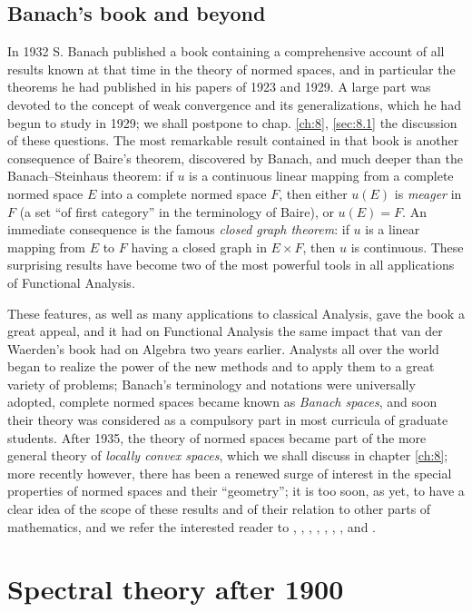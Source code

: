 \documentclass[12pt,a4paper,leqno,twoside]{extbook}
\begin{document}
\section{Banach's book and beyond}
\label{sec:6.5}

In 1932 S. Banach published a book \cite{015} containing a comprehensive account of all results known at that time in the theory of normed spaces, and in particular the theorems he had published in his papers of 1923 and 1929. A large part was devoted to the concept of weak convergence and its generalizations, which he had begun to study in 1929; we shall postpone to chap. \ref{ch:8}, \ref{sec:8.1} the discussion of these questions. The most remarkable result contained in that book is another consequence of Baire's theorem, discovered by Banach, and much deeper than the Banach--Steinhaus theorem: if \(u\) is a continuous linear mapping from a complete normed space \(E\) into a complete normed space \(F\), then either \(u(E)\) is \emph{meager} in \(F\) (a set ``of first category'' in the terminology of Baire), or \(u(E) = F\). An immediate consequence is the famous \emph{closed graph theorem}: if \(u\) is a linear mapping from \(E\) to \(F\) having a closed graph in \(E \times F\), then \(u\) is continuous. These surprising results have become two of the most powerful tools in all applications of Functional Analysis.

These features, as well as many applications to classical Analysis, gave the book a great appeal, and it had on Functional Analysis the same impact that van der Waerden's book had on Algebra two years earlier. Analysts all over the world began to realize the power of the new methods and to apply them to a great variety of problems; Banach's terminology and notations were universally adopted, complete normed spaces became known as \emph{Banach spaces}, and soon their theory was considered as a compulsory part in most curricula of graduate students. After 1935, the theory of normed spaces became part of the more general theory of \emph{locally convex spaces}, which we shall discuss in chapter \ref{ch:8}; more recently however, there has been a renewed surge of interest in the special properties of normed spaces and their ``geometry''; it is too soon, as yet, to have a clear idea of the scope of these results and of their relation to other parts of mathematics, and we refer the interested reader to \cite{004}, \cite{017}, \cite{047}, \cite{050}, \cite{116}, \cite{134}, \cite{149}, \cite{150} and \cite{185}.

\chapter{Spectral theory after 1900}
\label{ch:7}
\setcounter{equation}{0}
\end{document}
